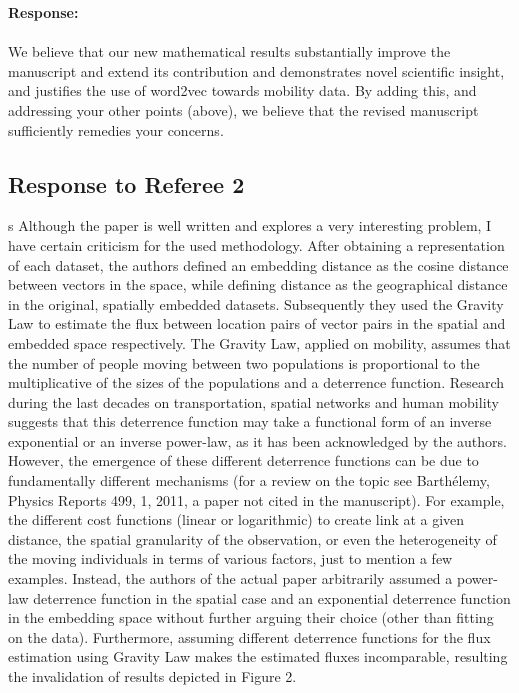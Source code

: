 \documentclass[12pt,a4paper]{article}
\newcounter{comment}[subsection]
\newcommand{\response}[1]{{\noindent \textbf{Response:} \\ \\ \noindent #1}}
\newcommand{\rcomment}[1]{%
\vspace{10pt}
\begin{sectionbox}
s #1
\end{sectionbox}
}
\begin{document}
\response{We believe that our new mathematical results substantially improve the manuscript and extend its contribution and demonstrates novel scientific insight, and justifies the use of word2vec towards mobility data. By adding this, and addressing your other points (above), we believe that the revised manuscript sufficiently remedies your concerns.

}



%
%
\clearpage
\setcounter{section}{3}
\subsection{Response to Referee 2}
\setcounter{section}{2}


\rcomment{%
	Although the paper is well written and explores a very interesting problem, I have certain criticism for the used methodology. After obtaining a representation of each dataset, the authors defined an embedding distance as the cosine distance between vectors in the space, while defining distance as the geographical distance in the original, spatially embedded datasets. Subsequently they used the Gravity Law to estimate the flux between location pairs of vector pairs in the spatial and embedded space respectively. The Gravity Law, applied on mobility, assumes that the number of people moving between two populations is proportional to the multiplicative of the sizes of the populations and a deterrence function. Research during the last decades on transportation, spatial networks and human mobility suggests that this deterrence function may take a functional form of an inverse exponential or an inverse power-law, as it has been acknowledged by the authors. However, the emergence of these different deterrence functions can be due to fundamentally different mechanisms (for a review on the topic see Barthélemy, Physics Reports 499, 1, 2011, a paper not cited in the manuscript). For example, the different cost functions (linear or logarithmic) to create link at a given distance, the spatial granularity of the observation, or even the heterogeneity of the moving individuals in terms of various factors, just to mention a few examples. Instead, the authors of the actual paper arbitrarily assumed a power-law deterrence function in the spatial case and an exponential deterrence function in the embedding space without further arguing their choice (other than fitting on the data). Furthermore, assuming different deterrence functions for the flux estimation using Gravity Law makes the estimated fluxes incomparable, resulting the invalidation of results depicted in Figure 2.
}
\end{document}
